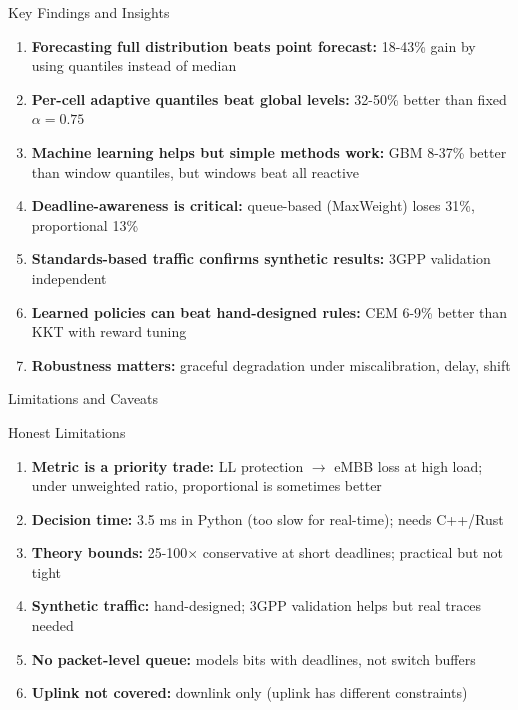 \documentclass[aspectratio=169]{beamer}
\begin{document}
\begin{frame}{Key Findings and Insights}
\begin{enumerate}
    \item \textbf{Forecasting full distribution beats point forecast:} 18-43\% gain by using quantiles instead of median
    
    \item \textbf{Per-cell adaptive quantiles beat global levels:} 32-50\% better than fixed $\alpha=0.75$
    
    \item \textbf{Machine learning helps but simple methods work:} GBM 8-37\% better than window quantiles, but windows beat all reactive
    
    \item \textbf{Deadline-awareness is critical:} queue-based (MaxWeight) loses 31\%, proportional 13\%
    
    \item \textbf{Standards-based traffic confirms synthetic results:} 3GPP validation independent
    
    \item \textbf{Learned policies can beat hand-designed rules:} CEM 6-9\% better than KKT with reward tuning
    
    \item \textbf{Robustness matters:} graceful degradation under miscalibration, delay, shift
\end{enumerate}
\end{frame}

\begin{frame}{Limitations and Caveats}
\begin{alertblock}{Honest Limitations}
\begin{enumerate}
    \item \textbf{Metric is a priority trade:} LL protection $\rightarrow$ eMBB loss at high load; under unweighted ratio, proportional is sometimes better
    
    \item \textbf{Decision time:} 3.5 ms in Python (too slow for real-time); needs C++/Rust
    
    \item \textbf{Theory bounds:} 25-100× conservative at short deadlines; practical but not tight
    
    \item \textbf{Synthetic traffic:} hand-designed; 3GPP validation helps but real traces needed
    
    \item \textbf{No packet-level queue:} models bits with deadlines, not switch buffers
    
    \item \textbf{Uplink not covered:} downlink only (uplink has different constraints)
\end{enumerate}
\end{alertblock}
\end{frame}
\end{document}
